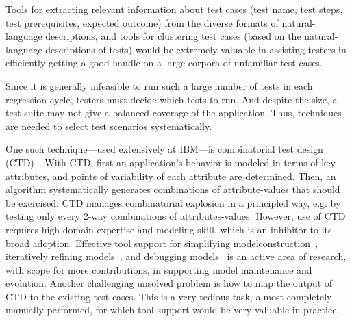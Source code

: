 Tools for extracting relevant information about test cases (\eg test name, test
steps, test prerequisites, expected outcome) from the diverse formats of
natural-language descriptions, and tools for clustering test cases (based on the
natural-language descriptions of tests) would be extremely valuable in assisting
testers in efficiently getting a good handle on a large corpora of unfamiliar
test cases. 

Since it is generally infeasible to run such a large number of tests in each
regression cycle, testers must decide which tests to run.  And despite the
size, a test suite may not give a balanced coverage of the application.
Thus, techniques are needed to select test scenarios systematically.  

One such technique---used extensively at IBM---is combinatorial test design 
(CTD)~\cite{Cohen:1996, Cohen:1997, Cohen:2003}.
With CTD, first an application's behavior is modeled in terms of key attributes,
and points of variability of each attribute are determined. Then, an algorithm
systematically generates combinations of attribute-values that should be exercised.
CTD manages combinatorial explosion in a principled way, e.g. by testing only
every 2-way combinations of attributes-values.  However, use of CTD requires high domain expertise
and modeling skill, which is an inhibitor to its broad adoption.  Effective tool 
support for simplifying modelconstruction~\cite{Segall:2012a}, iteratively refining
models~\cite{Segall:2012b}, and debugging models~\cite{Farchi:2013} is an active
area of research, with scope for more contributions, \eg in supporting model
maintenance and evolution.  
Another challenging unsolved problem is how to map the output of CTD 
to the existing test cases. This is a very tedious task, almost
completely manually performed, for which tool support would be very valuable in
practice.




